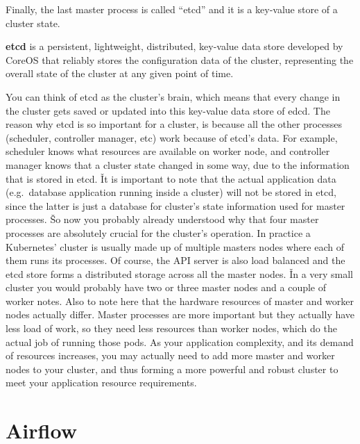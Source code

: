 Finally, the last master process is called ``etcd'' and it is a key-value store of a cluster state.

\bd[etcd]
\textbf{etcd} is a persistent, lightweight, distributed, key-value data store developed by CoreOS that reliably
stores the configuration data of the cluster, representing the overall state of the cluster at any given point of
time.
\ed


You can think of etcd as the cluster's brain, which means that every change in the cluster gets saved or updated into
this key-value data store of edcd. The reason why etcd is so important for a cluster, is because all the other
processes (scheduler, controller manager, etc) work because of etcd's data. For example, scheduler knows what
resources are available on worker node, and controller manager knows that a cluster state changed in some way, due to
the information that is stored in etcd. \v

It is important to note that the actual application data (e.g.\ database application running inside a cluster) will not
be stored in etcd, since the latter is just a database for cluster's state information used for master processes. \v

So now you probably already understood why that four master processes are absolutely crucial for the cluster's
operation. In practice a Kubernetes' cluster is usually made up of multiple masters nodes where each of them runs its
processes. Of course, the API server is also load balanced and the etcd store forms a distributed storage across all
the master nodes. \v

In a very small cluster you would probably have two or three master nodes and a couple of worker notes. Also to note
here that the hardware resources of master and worker nodes actually differ. Master processes are more important but
they actually have less load of work, so they need less resources than worker nodes, which do the actual job of
running those pods. As your application complexity, and its demand of resources increases, you may actually need to
add more master and worker nodes to your cluster, and thus forming a more powerful and robust cluster to meet your
application resource requirements.


\section{Airflow}\label{sec:airflow}

